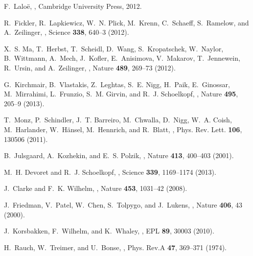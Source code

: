 \documentclass[11pt]{article}
\begin{document}
\begin{thebibliography}{100}
F.~Lalo{\"e},
,
\newblock Cambridge University Press, 2012.

R.~Fickler, R.~Lapkiewicz, W.~N. Plick, M.~Krenn, C.~Schaeff, S.~Ramelow, and
  A.~Zeilinger,
,
\newblock Science {\bf 338}, 640--3 (2012).

X.~S. Ma, T.~Herbst, T.~Scheidl, D.~Wang, S.~Kropatschek, W.~Naylor,
  B.~Wittmann, A.~Mech, J.~Kofler, E.~Anisimova, V.~Makarov, T.~Jennewein,
  R.~Ursin, and A.~Zeilinger,
,
\newblock Nature {\bf 489}, 269--73 (2012).

G.~Kirchmair, B.~Vlastakis, Z.~Leghtas, S.~E. Nigg, H.~Paik, E.~Ginossar,
  M.~Mirrahimi, L.~Frunzio, S.~M. Girvin, and R.~J. Schoelkopf,
,
\newblock Nature {\bf 495}, 205--9 (2013).

T.~Monz, P.~Schindler, J.~T. Barreiro, M.~Chwalla, D.~Nigg, W.~A. Coish,
  M.~Harlander, W.~Hänsel, M.~Hennrich, and R.~Blatt,
,
\newblock Phys. Rev. Lett. {\bf 106}, 130506 (2011).

B.~Julsgaard, A.~Kozhekin, and E.~S. Polzik,
,
\newblock Nature {\bf 413}, 400--403 (2001).

M.~H. Devoret and R.~J. Schoelkopf,
,
\newblock Science {\bf 339}, 1169--1174 (2013).

J.~Clarke and F.~K. Wilhelm,
,
\newblock Nature {\bf 453}, 1031--42 (2008).

J.~Friedman, V.~Patel, W.~Chen, S.~Tolpygo, and J.~Lukens,
,
\newblock Nature {\bf 406}, 43 (2000).

J.~Korsbakken, F.~Wilhelm, and K.~Whaley,
,
\newblock EPL {\bf 89}, 30003 (2010).

H.~Rauch, W.~Treimer, and U.~Bonse,
,
\newblock Phys. Rev.A {\bf 47}, 369--371 (1974).


\end{thebibliography}
\end{document}
